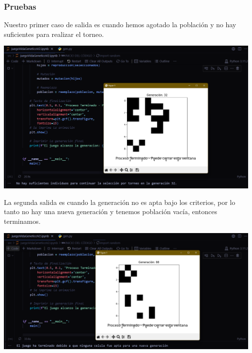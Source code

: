 \subsubsection*{Pruebas}

Nuestro primer caso de salida es cuando hemos agotado la población y no hay 
suficientes para realizar el torneo.
\begin{center}
    \includegraphics[scale = .4]{IMA/selecTorneo.png}
\end{center}

La segunda salida es cuando la generación no es apta bajo los criterios, por 
lo tanto no hay una nueva generación y tenemos población vacía, entonces 
terminamos.
\begin{center}
    \includegraphics[scale = .4]{IMA/poblacionVacia.png}
\end{center}

